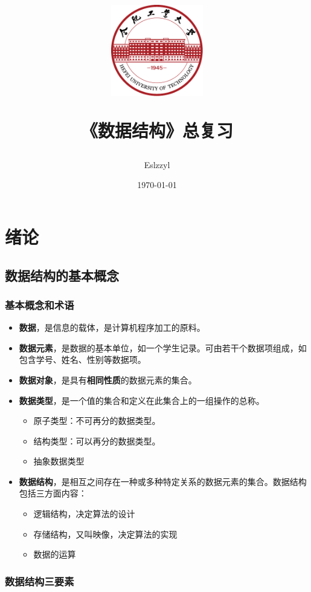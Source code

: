 \documentclass[12pt, a4paper, oneside]{ctexart}
\title{
    \includegraphics[width=0.3\textwidth]{../../../share/images/hfut-badge.pdf}
    
    \vspace{20pt}
    《数据结构》总复习
}
\author{Eslzzyl}
\date{\today}
\begin{document}
\maketitle
\newpage
\tableofcontents
\vspace{20pt}

\newpage

\section{绪论}

\subsection{数据结构的基本概念}

\subsubsection{基本概念和术语}

\begin{itemize}
  \item {\bf 数据}，是信息的载体，是计算机程序加工的原料。
  \item {\bf 数据元素}，是数据的基本单位，如一个学生记录。可由若干个数据项组成，如包含学号、姓名、性别等数据项。
  \item {\bf 数据对象}，是具有\textbf{相同性质}的数据元素的集合。
  \item {\bf 数据类型}，是一个值的集合和定义在此集合上的一组操作的总称。
  \begin{itemize}
    \item 原子类型：不可再分的数据类型。
    \item 结构类型：可以再分的数据类型。
    \item 抽象数据类型
  \end{itemize}
  \item {\bf 数据结构}，是相互之间存在一种或多种特定关系的数据元素的集合。数据结构包括三方面内容：
  \begin{itemize}
    \item 逻辑结构，决定算法的设计
    \item 存储结构，又叫映像，决定算法的实现
    \item 数据的运算
  \end{itemize}
\end{itemize}

\subsubsection{数据结构三要素}
\end{document}
